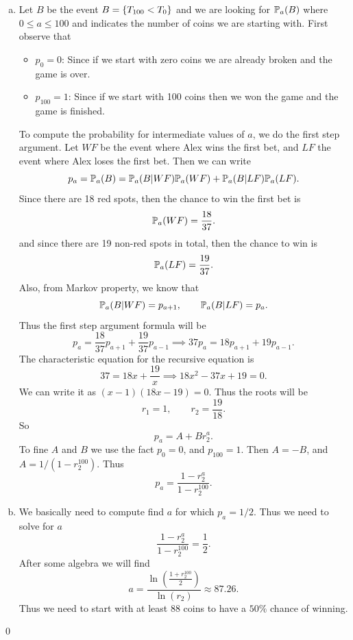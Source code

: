 \begin{solution}
	\begin{enumerate}[(a)]
		\item
		Let $B$ be the event $B = \{T_{100} < T_0\}$ and we are looking for $\mathbb{P}_a(B)$ where $0 \leq a \leq 100$ and indicates the number of coins we are starting with. First observe that
		\begin{itemize}
			\item $p_0 = 0$: Since if we start with zero coins we are already broken and the game is over.
			\item $p_{100} = 1$: Since if we start with 100 coins then we won the game and the game is finished.
		\end{itemize}
		To compute the probability for intermediate values of $a$, we do the first step argument. Let $WF$ be the event where Alex wins the first bet, and $LF$ the event where Alex loses the first bet. Then we can write
		\[ p_a = \mathbb{P}_a(B) = \mathbb{P}_a(B|WF)\mathbb{P}_a(WF) + \mathbb{P}_a(B|LF) \mathbb{P}_a(LF). \]
		Since there are 18 red spots, then the chance to win the first bet is
		\[ \mathbb{P}_a(WF) = \frac{18}{37}. \]
		and since there are 19 non-red spots in total, then the chance to win is
		\[ \mathbb{P}_a(LF)  = \frac{19}{37}.\]
		Also, from Markov property, we know that
		\[ \mathbb{P}_a(B|WF)= p_{a+1}, \qquad \mathbb{P}_a(B|LF)=p_a. \]
		Thus the first step argument formula will be
		\[  p_a = \frac{18}{37}p_{a+1} + \frac{19}{37}p_{a-1} \implies \boxed{37p_a = 18p_{a+1} + 19p_{a-1}}. \]
		The characteristic equation for the recursive equation is
		\[ 37 = 18 x + \frac{19}{x} \implies \boxed{18x^2 - 37x + 19 = 0}. \]
		We can write it as $(x-1)(18x-19) = 0$. Thus the roots will be
		\[ r_1 = 1, \qquad r_2 = \frac{19}{18}. \]
		So
		\[ p_a = A + Br_2^a. \]
		To fine $A$ and $B$ we use the fact $p_0 = 0$, and $p_{100} = 1$. Then $A = -B$, and $A = 1/(1-r_2^{100})$. Thus
		\[ \boxed{p_a = \frac{1-r_2^a}{1-r_2^{100}}}.  \]
		
		\item  We basically need to compute find $a$ for which $p_a = 1/2$. Thus we need to solve for $a$
		\[ \frac{1-r_2^a}{1-r_2^{100}} = \frac{1}{2}. \]
		After some algebra we will find
		\[  \boxed{a = \frac{\ln(\frac{1+r_2^{100}}{2})}{\ln(r_2)} \approx 87.26}.  \]
		Thus we need to start with at least 88 coins to have a $50\%$ chance of winning.
	\end{enumerate}
	\qed
\end{solution}


